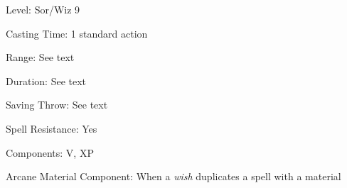 
\begin{description*}
\item[Level:] Sor/Wiz 9
\item[Casting Time:] 1 standard action
\item[Range:] See text
\item[Duration:] See text
\item[Saving Throw:] See text
\item[Spell Resistance:] Yes
\item[Components:] V, XP
\item[Arcane Material Component:] When a \textit{wish} duplicates a spell with a material
\end{description*}

